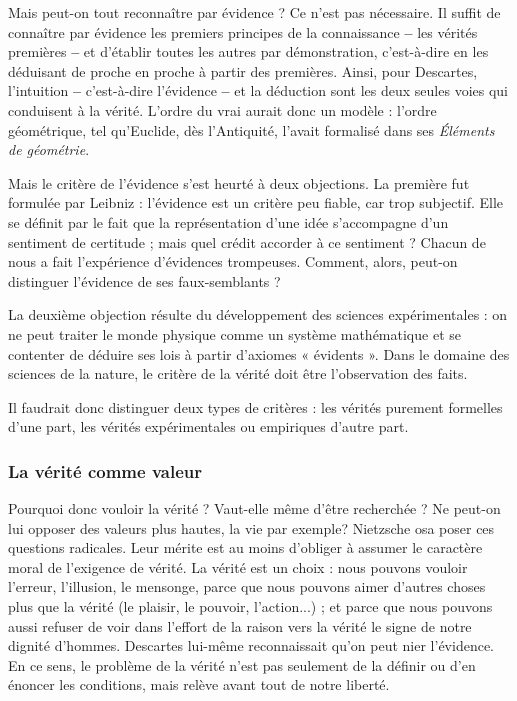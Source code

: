 Mais peut-on tout reconnaître par évidence ?
Ce n’est pas nécessaire. Il suffit
de connaître par évidence les premiers
principes de la connaissance {\bf --} les vérités
premières {\bf --} et d'établir toutes les autres
par démonstration, c'est-à-dire en les
déduisant de proche en proche à partir
des premières. Ainsi, pour Descartes,
l'intuition {\bf --} c'est-à-dire l'évidence {\bf --} et
la déduction sont les deux seules voies
qui conduisent à la vérité. L'ordre du vrai
aurait donc un modèle : l’ordre géométrique,
tel qu'Euclide, dès l'Antiquité,
l'avait formalisé dans ses {\it Éléments de géométrie}.

Mais le critère de l'évidence s'est heurté à
deux objections. La première fut formulée
par Leibniz : l'évidence est un critère peu
fiable, car trop subjectif. Elle se définit par
le fait que la représentation d'une idée
s'accompagne d'un sentiment de certitude ;
mais quel crédit accorder à ce sentiment ?
Chacun de nous a fait l'expérience
d'évidences trompeuses.
Comment, alors, peut-on distinguer l'évidence
de ses faux-semblants ?

La deuxième objection résulte du développement
des sciences expérimentales :
on ne peut traiter le monde physique
comme un système mathématique et se
contenter de déduire ses lois à partir
d’axiomes « évidents ». Dans le domaine
des sciences de la nature, le critère de la
vérité doit être l'observation des faits.

Il faudrait donc distinguer deux types de
critères : les vérités purement formelles
d'une part, les vérités expérimentales ou
empiriques d’autre part.

\subsubsection{La vérité comme valeur}

Pourquoi donc vouloir la vérité ? Vaut-elle
même d'être recherchée ? Ne peut-on
lui opposer des valeurs plus hautes,
la vie par exemple? Nietzsche osa
poser ces questions radicales. Leur
mérite est au moins d’obliger à assumer
le caractère moral de l'exigence de
vérité. La vérité est un choix : nous pouvons
vouloir l’erreur, l’illusion, le mensonge,
parce que nous pouvons aimer
d’autres choses plus que la vérité (le
plaisir, le pouvoir, l’action...) ; et parce
que nous pouvons aussi refuser de voir
dans l'effort de la raison vers la vérité le
signe de notre dignité d'hommes. Descartes
lui-même reconnaissait qu’on
peut nier l'évidence. En ce sens, le problème
de la vérité n’est pas seulement
de la définir ou d’en énoncer les conditions,
mais relève avant tout de notre
liberté.

